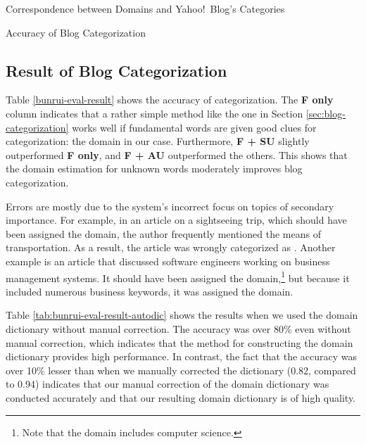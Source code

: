 \documentclass[english]{jnlp_1.4_rep}
\newcommand{\dom}[1]{}
\begin{document}
\begin{table}[t]
\caption{Correspondence between Domains and Yahoo!~Blog's Categories}
\label{tab:domain-yahoo}

\end{table}
\begin{table}[t]
\caption{Accuracy of Blog Categorization}
\label{bunrui-eval-result}

\end{table}



\subsection{Result of Blog Categorization}

Table \ref{bunrui-eval-result} shows the accuracy of categorization.
The \textbf{F only} column indicates that a rather simple method like
the one in Section \ref{sec:blog-categorization} works well if
fundamental words are given good clues for categorization:
the domain in our case.
Furthermore, \textbf{F + SU} slightly outperformed \textbf{F only}, and
\textbf{F + AU} outperformed the others.
This shows that the domain estimation for unknown words moderately
improves blog categorization.

Errors are mostly due to the system's incorrect focus on
topics of secondary importance.
For example, in an article on a sightseeing trip, which should have been 
assigned the \dom{recreation} domain, the author frequently mentioned the
means of transportation. 
As a result, the article was wrongly categorized as
\dom{transportation}. 
Another example is an article that discussed software engineers working on
business management systems.
It should have been assigned the \dom{science} domain,\footnote{
Note that the \dom{science} domain includes computer science.
} 
but because it included numerous business keywords, 
it was assigned the \dom{business} domain. 

Table \ref{tab:bunrui-eval-result-autodic} shows the results when
we used the domain dictionary without manual correction.
The accuracy was over 80\% even without 
manual correction, which indicates that the method for constructing the
domain dictionary provides high performance.
In contrast, the fact that the accuracy was over 10\% lesser than when
we manually corrected the dictionary 
(0.82, compared to 0.94) indicates that our manual correction of the domain
dictionary was conducted accurately and that our resulting domain
dictionary is of high quality.
\end{document}
